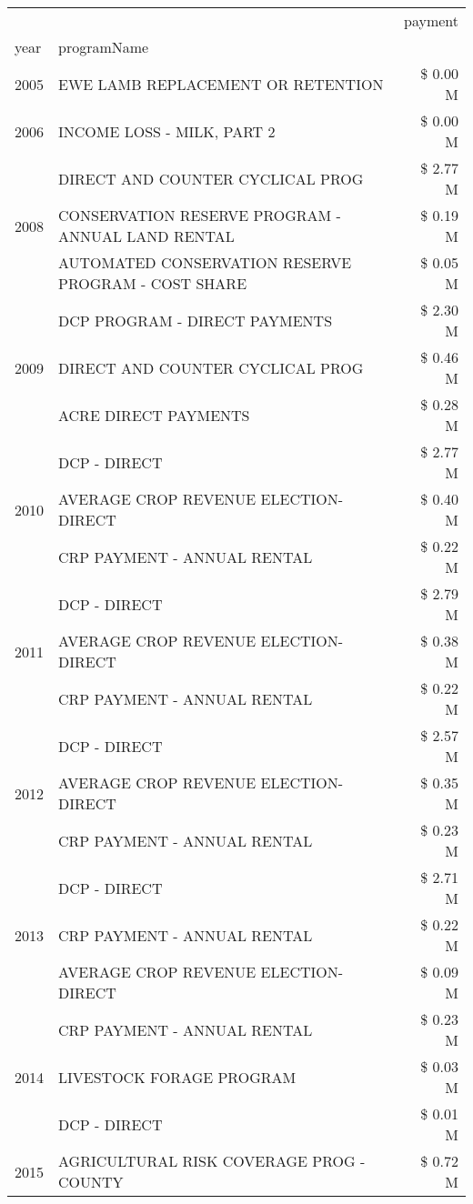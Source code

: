 \begin{tabular}{llr}
\toprule
 &  & payment \\
year & programName &  \\
\midrule
2005 & EWE LAMB REPLACEMENT OR RETENTION & \$ 0.00 M \\
\cline{1-3}
2006 & INCOME LOSS - MILK, PART 2 & \$ 0.00 M \\
\cline{1-3}
\multirow[t]{3}{*}{2008} & DIRECT AND COUNTER CYCLICAL PROG & \$ 2.77 M \\
 & CONSERVATION RESERVE PROGRAM - ANNUAL LAND RENTAL & \$ 0.19 M \\
 & AUTOMATED CONSERVATION RESERVE PROGRAM - COST SHARE & \$ 0.05 M \\
\cline{1-3}
\multirow[t]{3}{*}{2009} & DCP PROGRAM - DIRECT PAYMENTS & \$ 2.30 M \\
 & DIRECT AND COUNTER CYCLICAL PROG & \$ 0.46 M \\
 & ACRE DIRECT PAYMENTS & \$ 0.28 M \\
\cline{1-3}
\multirow[t]{3}{*}{2010} & DCP - DIRECT & \$ 2.77 M \\
 & AVERAGE CROP REVENUE ELECTION-DIRECT & \$ 0.40 M \\
 & CRP PAYMENT - ANNUAL RENTAL & \$ 0.22 M \\
\cline{1-3}
\multirow[t]{3}{*}{2011} & DCP - DIRECT & \$ 2.79 M \\
 & AVERAGE CROP REVENUE ELECTION-DIRECT & \$ 0.38 M \\
 & CRP PAYMENT - ANNUAL RENTAL & \$ 0.22 M \\
\cline{1-3}
\multirow[t]{3}{*}{2012} & DCP - DIRECT & \$ 2.57 M \\
 & AVERAGE CROP REVENUE ELECTION-DIRECT & \$ 0.35 M \\
 & CRP PAYMENT - ANNUAL RENTAL & \$ 0.23 M \\
\cline{1-3}
\multirow[t]{3}{*}{2013} & DCP - DIRECT & \$ 2.71 M \\
 & CRP PAYMENT - ANNUAL RENTAL & \$ 0.22 M \\
 & AVERAGE CROP REVENUE ELECTION-DIRECT & \$ 0.09 M \\
\cline{1-3}
\multirow[t]{3}{*}{2014} & CRP PAYMENT - ANNUAL RENTAL & \$ 0.23 M \\
 & LIVESTOCK FORAGE PROGRAM & \$ 0.03 M \\
 & DCP - DIRECT & \$ 0.01 M \\
\cline{1-3}
\multirow[t]{3}{*}{2015} & AGRICULTURAL RISK COVERAGE PROG - COUNTY & \$ 0.72 M \\

\end{tabular}
